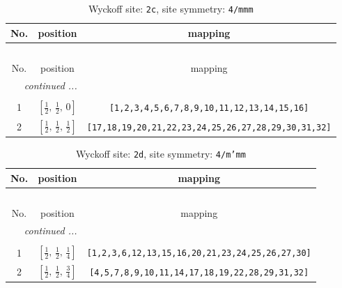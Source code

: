 \documentclass[fleqn,8pt]{jsarticle}
\begin{document}
\renewcommand{\arraystretch}{1.2}
\begin{longtable}{ccc}
\caption{Wyckoff site: {\tt 2c}, site symmetry: {\tt 4/mmm}}
 \\
 \hline \hline
No. & position & mapping \\ \hline \endfirsthead

\multicolumn{2}{l}{\tablename\ \thetable{}} \\
 \hline \hline
No. & position & mapping \\ \hline \endhead

 \hline \hline
\multicolumn{2}{r}{\footnotesize\it continued ...} \\ \endfoot

 \hline \hline
\multicolumn{2}{r}{} \\ \endlastfoot

1 & $\left[ \frac{1}{2},\, \frac{1}{2},\, 0 \right]$ & {\tt [1,2,3,4,5,6,7,8,9,10,11,12,13,14,15,16]} \\ \hline
2 & $\left[ \frac{1}{2},\, \frac{1}{2},\, \frac{1}{2} \right]$ & {\tt [17,18,19,20,21,22,23,24,25,26,27,28,29,30,31,32]} \\
\end{longtable}
\renewcommand{\arraystretch}{1.2}
\begin{longtable}{ccc}
\caption{Wyckoff site: {\tt 2d}, site symmetry: {\tt 4/m'mm}}
 \\
 \hline \hline
No. & position & mapping \\ \hline \endfirsthead

\multicolumn{2}{l}{\tablename\ \thetable{}} \\
 \hline \hline
No. & position & mapping \\ \hline \endhead

 \hline \hline
\multicolumn{2}{r}{\footnotesize\it continued ...} \\ \endfoot

 \hline \hline
\multicolumn{2}{r}{} \\ \endlastfoot

1 & $\left[ \frac{1}{2},\, \frac{1}{2},\, \frac{1}{4} \right]$ & {\tt [1,2,3,6,12,13,15,16,20,21,23,24,25,26,27,30]} \\ \hline
2 & $\left[ \frac{1}{2},\, \frac{1}{2},\, \frac{3}{4} \right]$ & {\tt [4,5,7,8,9,10,11,14,17,18,19,22,28,29,31,32]} \\
\end{longtable}
\renewcommand{\arraystretch}{1.2}
\end{document}
